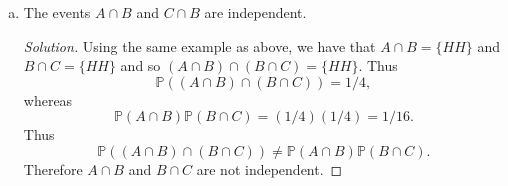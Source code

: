 \documentclass[12pt]{article}
\newenvironment{solution}
{\renewcommand\qedsymbol{$\blacksquare$}\begin{proof}[Solution]}
{\end{proof}}
\begin{document}
\begin{enumerate}
\begin{enumerate}[(a)]
\begin{solution}
                        The possible outcomes of this experiment are
                        $\Omega=\{HH, HT, TH, TT\}$. Let $A$ denote the event
                        that a heads occurred on the first flip. Then $A=\{HH,
                        HT\}$. Let $B$ denote the event that a heads occurred
                        on the last flip, then $B=\{HH, TH\}$. Finally, let
                        $C$ denote the event that both flips were the same,
                        then $C=\{HH, TT\}$. From this it follows that 
                        \begin{equation*}
                            (A\cup B)\cap C = {HH}.
                        \end{equation*}
                        Thus 
                        \begin{equation*}
                            \mathbb{P}((A\cup B)\cap C)=1/4
                        \end{equation*}
                        whereas
                        \begin{equation*}
                            \mathbb{P}(A\cup B)\mathbb{P}(C)=(3/4)(1/4)=3/16.
                        \end{equation*}
                        Therefore $\mathbb{P}((A\cup B)\cap
                        C)\neq\mathbb{P}(A\cup B)\mathbb{P}(C)$ and so $A\cup
                        B$ and $C$ are not
                        independent. 
                    \end{solution}
                \item The events $A\cap B$ and $C\cap B$ are independent. 
                    \begin{solution}
                        Using the same example as above, we have that $A\cap
                        B=\{HH\}$ and $B\cap C=\{HH\}$ and so $(A\cap
                        B)\cap(B\cap C)=\{HH\}$. Thus
                        \begin{equation*}
                            \mathbb{P}((A\cap B)\cap (B\cap C))=1/4,
                        \end{equation*}
                        whereas
                        \begin{equation*}
                            \mathbb{P}(A\cap B)\mathbb{P}(B\cap
                            C)=(1/4)(1/4)=1/16.
                        \end{equation*}
                        Thus 
                        \begin{equation*}
                            \mathbb{P}((A\cap B)\cap(B\cap
                            C))\neq\mathbb{P}(A\cap B)\mathbb{P}(B\cap C).
                        \end{equation*}
                        Therefore $A\cap B$ and $B\cap C$ are not independent. 
                    \end{solution}
            \end{enumerate}
    \end{enumerate}
\end{document}
